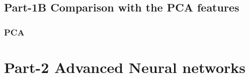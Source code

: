 \documentclass[12pt,t]{beamer}
\begin{document}
\begin{frame}
\begin{columns}
    \end{columns}
\end{frame}


\subsection{Part-1B Comparison with the PCA features}

\begin{frame}
    \frametitle{PCA }

    

\end{frame}
\section{Part-2 Advanced Neural networks}
\begin{frame}
    \frametitle{}

    

\end{frame}
\end{document}
